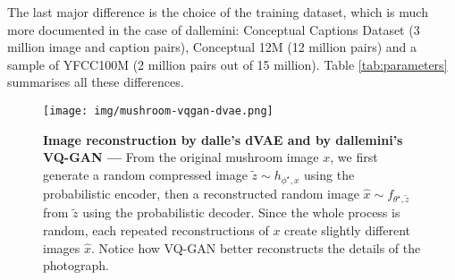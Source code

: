 \documentclass{article}
\begin{document}
\begin{multicols}{2}
The last major difference is the choice of the training dataset, which is much more documented in the case of \gls{dallemini}: Conceptual Captions Dataset (3 million image and caption pairs), Conceptual 12M (12 million pairs) and a sample of YFCC100M (2 million pairs out of 15 million). Table \ref{tab:parameters} summarises all these differences.

\end{multicols}

\begin{figure}
    \centering
    \texttt{[image: img/mushroom-vqgan-dvae.png]}
    \caption[Image reconstruction]{\textbf{Image reconstruction by \gls{dalle}'s dVAE and by \gls{dallemini}'s VQ-GAN —} From the original mushroom image $x$, we first generate a random compressed image $\tilde z \sim h_{\phi^\star,x}$ using the probabilistic encoder, then a reconstructed random image $\hat x\sim f_{\theta^\star,\tilde z}$ from $\tilde z$ using the probabilistic decoder. Since the whole process is random, each repeated reconstructions of $x$ create slightly different images $\hat x$. Notice how VQ-GAN better reconstructs the details of the photograph.}
    \label{fig:mushroom}
\end{figure}


\begin{table*}[h!]
\caption{\textbf{Parameters and distribution families for different versions of \gls{dalle}}, including our own implementation of DALL-E: \gls{dalletiny}}
\label{tab:parameters}
\end{table*}
\end{document}
